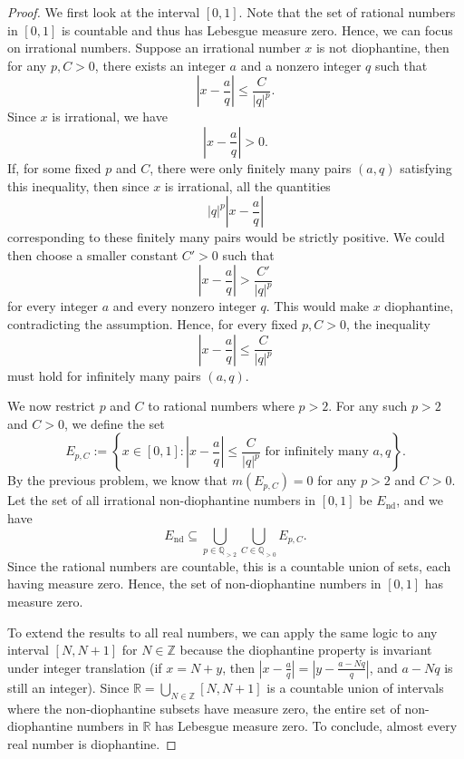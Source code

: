 \begin{proof}
   We first look at the interval $[0,1]$. Note that the set of rational numbers in $[0,1]$ is countable and thus has Lebesgue measure zero. Hence, we can focus on irrational numbers. Suppose an irrational number $x$ is not diophantine, then for any $p,C>0$, there exists an integer $a$ and a nonzero integer $q$ such that
   \[
   |x - \frac{a}{q}| \le \frac{C}{|q|^p}.
   \]
   Since $x$ is irrational, we have
   \[
   |x - \frac{a}{q}| > 0.
   \]
   If, for some fixed $p$ and $C$, there were only finitely many pairs $(a,q)$ satisfying this inequality, then since $x$ is irrational, all the quantities
   \[
   |q|^p|x-\frac{a}{q}|
   \]
   corresponding to these finitely many pairs would be strictly positive. We could then choose a smaller constant $C'>0$ such that
   \[
   |x-\frac{a}{q}|>\frac{C'}{|q|^p}
   \]
   for every integer $a$ and every nonzero integer $q$. This would make $x$ diophantine, contradicting the assumption. Hence, for every fixed $p,C>0$, the inequality
   \[
   |x-\frac{a}{q}|\leq \frac{C}{|q|^p}
   \]
   must hold for infinitely many pairs $(a,q)$.

   We now restrict $p$ and $C$ to rational numbers where $p>2$. For any such $p>2$ and $C>0$, we define the set
   \[
   E_{p,C} := \left\{x \in [0,1] : |x - \frac{a}{q}| \le \frac{C}{|q|^p} \text{ for infinitely many } a, q\right\}.
   \]
   By the previous problem, we know that $m(E_{p,C}) = 0$ for any $p > 2$ and $C > 0$. Let the set of all irrational non-diophantine numbers in $[0,1]$ be $E_{\mathrm{nd}}$, and we have
   \[
   E_{\mathrm{nd}} \subseteq \bigcup_{p \in \mathbb{Q}_{>2}} \bigcup_{C \in \mathbb{Q}_{>0}} E_{p,C}.
   \]
   Since the rational numbers are countable, this is a countable union of sets, each having measure zero. Hence, the set of non-diophantine numbers in $[0,1]$ has measure zero.

   To extend the results to all real numbers, we can apply the same logic to any interval $[N, N+1]$ for $N \in \mathbb{Z}$ because the diophantine property is invariant under integer translation (if $x=N+y$, then $|x-\frac{a}{q}| = |y-\frac{a-Nq}{q}|$, and $a-Nq$ is still an integer). Since $\mathbb{R} = \bigcup_{N \in \mathbb{Z}} [N, N+1]$ is a countable union of intervals where the non-diophantine subsets have measure zero, the entire set of non-diophantine numbers in $\mathbb{R}$ has Lebesgue measure zero. To conclude, almost every real number is diophantine.
\end{proof}

